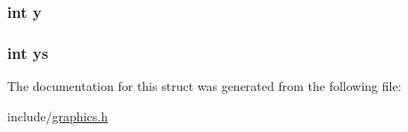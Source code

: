 \subsubsection[{\texorpdfstring{y}{y}}]{\setlength{\rightskip}{0pt plus 5cm}int y}\hypertarget{structmobile__object__t_a0a2f84ed7838f07779ae24c5a9086d33}{}\label{structmobile__object__t_a0a2f84ed7838f07779ae24c5a9086d33}
\subsubsection[{\texorpdfstring{ys}{ys}}]{\setlength{\rightskip}{0pt plus 5cm}int ys}\hypertarget{structmobile__object__t_aed10fe93094b6ff4ca09057614bb3602}{}\label{structmobile__object__t_aed10fe93094b6ff4ca09057614bb3602}


The documentation for this struct was generated from the following file\+:\begin{DoxyCompactItemize}
\item 
include/\hyperlink{graphics_8h}{graphics.\+h}\end{DoxyCompactItemize}
